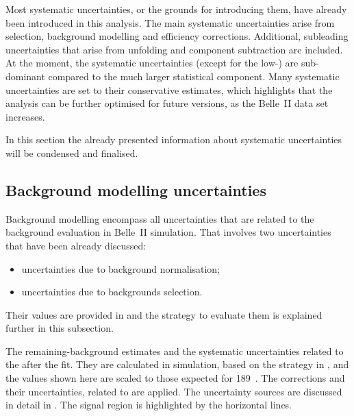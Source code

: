 Most systematic uncertainties, or the grounds for introducing them, have already been introduced in this analysis.
The main systematic uncertainties arise from selection, background modelling and efficiency corrections.
Additional, subleading uncertainties that arise from unfolding and \BtoXdgamma component subtraction are included.
At the moment, the systematic uncertainties (except for the low-\EB) are sub-dominant compared to the much larger statistical component.
Many systematic uncertainties are set to their conservative estimates, 
which highlights that the analysis can be further optimised for future versions, as the Belle~II data set increases.

In this section the already presented information about systematic uncertainties will be condensed and finalised.


\subsection{Background modelling uncertainties}\label{sec:background_uncertainties}

Background modelling encompass all uncertainties that are related to the background evaluation in Belle~II simulation.
That involves two uncertainties that have been already discussed:
\begin{itemize}
    \item uncertainties due to background normalisation;
    \item uncertainties due to backgrounds selection.
\end{itemize}
Their values are provided in  and the strategy to evaluate them is explained further in this subsection.

\begin{table}[htbp!]
    \centering
    \caption{\label{tab:background_uncertainties} 
    The remaining-\BB background estimates and the systematic uncertainties related to the  after the \Mbc fit.
    They are calculated in simulation, based on the strategy in , 
    and the values shown here are scaled to those expected for 189~\invfb.
    The corrections and their uncertainties, related to  are applied.
    The uncertainty sources are discussed in detail in .
    The signal region is highlighted by the horizontal lines.
    }
    
\end{table}


